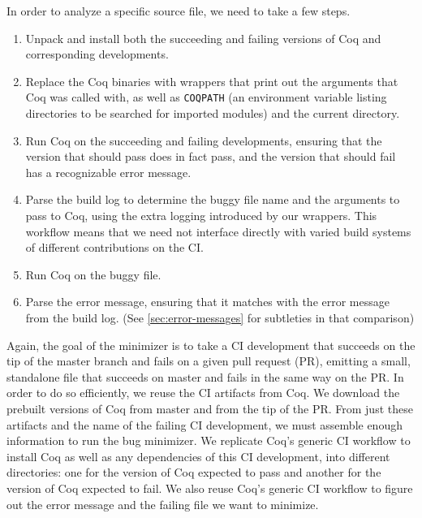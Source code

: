 \documentclass[a4paper,USenglish,cleveref,autoref,thm-restate]{lipics-v2021}
\begin{document}
In order to analyze a specific source file, we need to take a few steps.
\begin{enumerate}
\item Unpack and install both the succeeding and failing versions of Coq and corresponding developments.
\item Replace the Coq binaries with wrappers that print out the arguments that Coq was called with, as well as \texttt{COQPATH} (an environment variable listing directories to be searched for imported modules) and the current directory.
\item Run Coq on the succeeding and failing developments, ensuring that the version that should pass does in fact pass, and the version that should fail has a recognizable error message.
\item Parse the build log to determine the buggy file name and the arguments to pass to Coq, using the extra logging introduced by our wrappers.
  This workflow means that we need not interface directly with varied build systems of different contributions on the CI.
\item Run Coq on the buggy file.
\item Parse the error message, ensuring that it matches with the error message from the build log.
  (See \autoref{sec:error-messages} for subtleties in that comparison)
\end{enumerate}

Again, the goal of the minimizer is to take a CI development that succeeds on the tip of the master branch and fails on a given pull request (PR), emitting a small, standalone file that succeeds on master and fails in the same way on the PR.
In order to do so efficiently, we reuse the CI artifacts from Coq.
We download the prebuilt versions of Coq from master and from the tip of the PR.
From just these artifacts and the name of the failing CI development, we must assemble enough information to run the bug minimizer.
We replicate Coq's generic CI workflow to install Coq as well as any dependencies of this CI development, into different directories: one for the version of Coq expected to pass and another for the version of Coq expected to fail.
We also reuse Coq's generic CI workflow to figure out the error message and the failing file we want to minimize.
\end{document}
